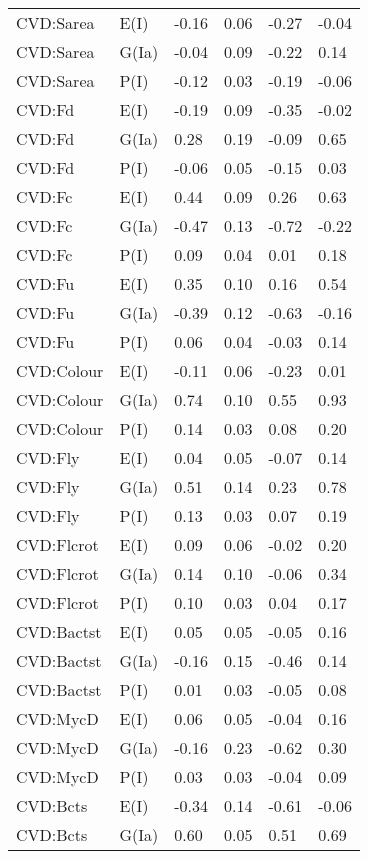\begin{center}
\begin{longtable}{|p{1.1in}|p{0.7in}|p{0.7in}|p{0.6in}|p{0.6in}|p{0.6in}|}
  CVD:Sarea & E(I) & -0.16 & 0.06 & -0.27 & -0.04 \\ 
  CVD:Sarea & G(Ia) & -0.04 & 0.09 & -0.22 & 0.14 \\ 
  CVD:Sarea & P(I) & -0.12 & 0.03 & -0.19 & -0.06 \\ 
  CVD:Fd & E(I) & -0.19 & 0.09 & -0.35 & -0.02 \\ 
  CVD:Fd & G(Ia) & 0.28 & 0.19 & -0.09 & 0.65 \\ 
  CVD:Fd & P(I) & -0.06 & 0.05 & -0.15 & 0.03 \\ 
  CVD:Fc & E(I) & 0.44 & 0.09 & 0.26 & 0.63 \\ 
  CVD:Fc & G(Ia) & -0.47 & 0.13 & -0.72 & -0.22 \\ 
  CVD:Fc & P(I) & 0.09 & 0.04 & 0.01 & 0.18 \\ 
  CVD:Fu & E(I) & 0.35 & 0.10 & 0.16 & 0.54 \\ 
  CVD:Fu & G(Ia) & -0.39 & 0.12 & -0.63 & -0.16 \\ 
  CVD:Fu & P(I) & 0.06 & 0.04 & -0.03 & 0.14 \\ 
  CVD:Colour & E(I) & -0.11 & 0.06 & -0.23 & 0.01 \\ 
  CVD:Colour & G(Ia) & 0.74 & 0.10 & 0.55 & 0.93 \\ 
  CVD:Colour & P(I) & 0.14 & 0.03 & 0.08 & 0.20 \\ 
  CVD:Fly & E(I) & 0.04 & 0.05 & -0.07 & 0.14 \\ 
  CVD:Fly & G(Ia) & 0.51 & 0.14 & 0.23 & 0.78 \\ 
  CVD:Fly & P(I) & 0.13 & 0.03 & 0.07 & 0.19 \\ 
  CVD:Flcrot & E(I) & 0.09 & 0.06 & -0.02 & 0.20 \\ 
  CVD:Flcrot & G(Ia) & 0.14 & 0.10 & -0.06 & 0.34 \\ 
  CVD:Flcrot & P(I) & 0.10 & 0.03 & 0.04 & 0.17 \\ 
  CVD:Bactst & E(I) & 0.05 & 0.05 & -0.05 & 0.16 \\ 
  CVD:Bactst & G(Ia) & -0.16 & 0.15 & -0.46 & 0.14 \\ 
  CVD:Bactst & P(I) & 0.01 & 0.03 & -0.05 & 0.08 \\ 
  CVD:MycD & E(I) & 0.06 & 0.05 & -0.04 & 0.16 \\ 
  CVD:MycD & G(Ia) & -0.16 & 0.23 & -0.62 & 0.30 \\ 
  CVD:MycD & P(I) & 0.03 & 0.03 & -0.04 & 0.09 \\ 
  CVD:Bcts & E(I) & -0.34 & 0.14 & -0.61 & -0.06 \\ 
  CVD:Bcts & G(Ia) & 0.60 & 0.05 & 0.51 & 0.69 \\ 

\end{longtable}
\end{center}
